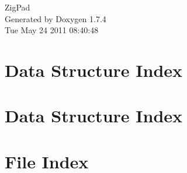 \documentclass[a4paper]{book}
\begin{document}
\hypersetup{pageanchor=false}
\begin{titlepage}
\vspace*{7cm}
\begin{center}
{\Large ZigPad }\\
\vspace*{1cm}
{\large Generated by Doxygen 1.7.4}\\
\vspace*{0.5cm}
{\small Tue May 24 2011 08:40:48}\\
\end{center}
\end{titlepage}
\clearemptydoublepage
{}
\tableofcontents
\clearemptydoublepage
{}
\hypersetup{pageanchor=true}
\chapter{Data Structure Index}

\chapter{Data Structure Index}

\chapter{File Index}

\end{document}

